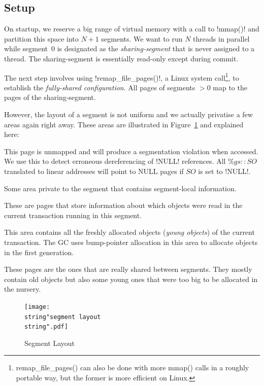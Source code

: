 \documentclass{sigplanconf}
\makeatletter
\renewcommand\lstinline[1][]{%
  \Collectverb{\@@myverb}%
}
\def\@@myverb#1{%
    \begingroup
    \fboxsep=0.2em
    \colorbox{verylightgray}{\oldlstinline|#1|}%
    \endgroup
}
\makeatother
\begin{document}
\subsection{Setup\label{sub:Setup}}

On startup, we reserve a big range of virtual memory with a call to
\lstinline!mmap()! and partition this space into $N+1$ segments. We
want to run $N$ threads in parallel while segment~0 is designated as
the \emph{sharing-segment} that is never assigned to a thread. The
sharing-segment is essentially read-only except during commit.

The next step involves using \lstinline!remap_file_pages()!, a Linux
system call\footnote{remap\_file\_pages() can also be done with more mmap()
calls in a roughly portable way, but the former is more efficient on Linux.},
to establish the \emph{fully-shared configuration}.  All pages
of segments $>0$ map to the pages of the sharing-segment.

However, the layout of a segment is not uniform and we actually
privatise a few areas again right away. These areas are illustrated in
Figure~\ref{fig:Segment-Layout} and explained here:
\begin{description}[noitemsep]
\item [{NULL~page:}] This page is unmapped and will produce a
  segmentation violation when accessed. We use this to detect
  erroneous dereferencing of \lstinline!NULL! references.  All
  $\%gs{::}SO$ translated to linear addresses will point to NULL pages
  if $SO$ is set to \lstinline!NULL!.
\item [{Segment-local~data:}] Some area private to the segment that
  contains segment-local information.
\item [{Read~markers:}] These are pages that store information about
  which objects were read in the current transaction running in this
  segment.
\item [{Nursery:}] This area contains all the freshly allocated
  objects (\emph{young objects}) of the current transaction. The GC
  uses bump-pointer allocation in this area to allocate objects in the
  first generation.
\item [{Old~object~space:}] These pages are the ones that are really
  shared between segments. They mostly contain old objects but also
  some young ones that were too big to be allocated in the nursery.
\end{description}



\begin{figure}[t]
  \centering
  \texttt{[image: \\string"segment layout\\string".pdf]}
  \caption{Segment Layout\label{fig:Segment-Layout}}
\end{figure}
\end{document}
